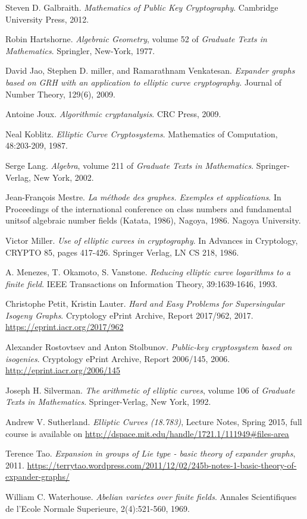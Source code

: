 \documentclass{article}
\theoremstyle{theorem}
\theoremstyle{definition}
\begin{document}
\begin{thebibliography}{}
	 Steven D. Galbraith. \textit{Mathematics of Public Key Cryptography}. Cambridge University Press, 2012.
	
	 Robin Hartshorne. \textit{Algebraic Geometry}, volume 52 of \textit{Graduate Texts in Mathematics}. Springler, New-York, 1977.
	
	 David Jao, Stephen D. miller, and Ramarathnam Venkatesan. \textit{Expander graphs based on GRH with an application to elliptic curve cryptography.} Journal of Number Theory, 129(6), 2009.
	
	 Antoine Joux. \textit{Algorithmic cryptanalysis}. CRC Press, 2009.
	
	 Neal Koblitz. \textit{Elliptic Curve Cryptosystems}. Mathematics of Computation, 48:203-209, 1987.
	
	 Serge Lang. \textit{Algebra}, volume 211 of \textit{Graduate Texts in Mathematics}. Springer-Verlag, New York, 2002.

	 Jean-François Mestre. \textit{La méthode des graphes. Exemples et applications}. In Proceedings of the international conference on class numbers and fundamental unitsof algebraic number fields (Katata, 1986), Nagoya, 1986. Nagoya University.
	
	 Victor Miller. \textit{Use of elliptic curves in cryptography}. In Advances in Cryptology, CRYPTO 85, pages 417-426. Springer Verlag, LN CS 218, 1986.
	
	 A. Menezes, T. Okamoto, S. Vanstone. \textit{Reducing elliptic curve logarithms to a finite field}. IEEE Transactions on Information Theory, 39:1639-1646, 1993.
	
	 Christophe Petit, Kristin Lauter. \textit{Hard and Easy Problems for Supersingular Isogeny Graphs}. Cryptology ePrint Archive, Report 2017/962, 2017. \url{https://eprint.iacr.org/2017/962}
	
	 Alexander Rostovtsev and Anton Stolbunov. \textit{Public-key cryptosystem based on isogenies}. Cryptology ePrint Archive, Report 2006/145, 2006. \url{http://eprint.iacr.org/2006/145}
	
	 Joseph H. Silverman. \textit{The arithmetic of elliptic curves}, volume 106 of \textit{Graduate Texts in Mathematics}. Springer-Verlag, New York, 1992.

	 Andrew V. Sutherland. \textit{  Elliptic Curves (18.783)}, Lecture Notes, Spring 2015, full course is available on \url{http://dspace.mit.edu/handle/1721.1/111949#files-area}
	
	 Terence Tao. \textit{Expansion in groups of Lie type  - basic theory of expander graphs}, 2011. \url{https://terrytao.wordpress.com/2011/12/02/245b-notes-1-basic-theory-of-expander-graphs/}
	
	 William C. Waterhouse. \textit{Abelian varietes over finite fields}. Annales Scientifiques de l'Ecole Normale Superieure, 2(4):521-560, 1969.
	
	
\end{thebibliography}
\end{document}
